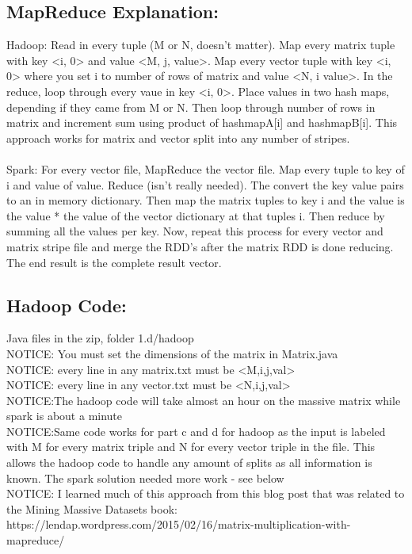 \subsection*{MapReduce Explanation:}
Hadoop: Read in every tuple (M or N, doesn't matter). Map every matrix tuple with key <i, 0> and value <M, j, value>. Map every vector tuple with key <i, 0> where you set i to number of rows of matrix and value <N, i value>. In the reduce, loop through every vaue in key <i, 0>. Place values in two hash maps, depending if they came from M or N. Then loop through number of rows in matrix and increment sum using product of hashmapA[i] and hashmapB[i]. This approach works for matrix and vector split into any number of stripes. 
\\
\\
Spark: For every vector file, MapReduce the vector file. Map every tuple to key of i and value of value. Reduce (isn't really needed). The convert the key value pairs to an in memory dictionary. Then map the matrix tuples to key i and the value is the value * the value of the vector dictionary at that tuples i. Then reduce by summing all the values per key. Now, repeat this process for every vector and matrix stripe file and merge the RDD's after the matrix RDD is done reducing. The end result is the complete result vector. 

\subsection*{Hadoop Code:}
Java files in the zip, folder 1.d/hadoop
\\
NOTICE: You must set the dimensions of the matrix in Matrix.java
\\
NOTICE: every line in any matrix.txt must be <M,i,j,val>
\\
NOTICE: every line in any vector.txt must be <N,i,j,val>
\\
NOTICE:The hadoop code will take almost an hour on the massive matrix while spark is about a minute
\\
NOTICE:Same code works for part c and d for hadoop as the input is labeled with M for every matrix triple and N for every vector triple in the file. This allows the hadoop code to handle any amount of splits as all information is known. The spark solution needed more work - see below
\\
NOTICE: I learned much of this approach from this blog post that was related to the Mining Massive Datasets book: https://lendap.wordpress.com/2015/02/16/matrix-multiplication-with-mapreduce/

